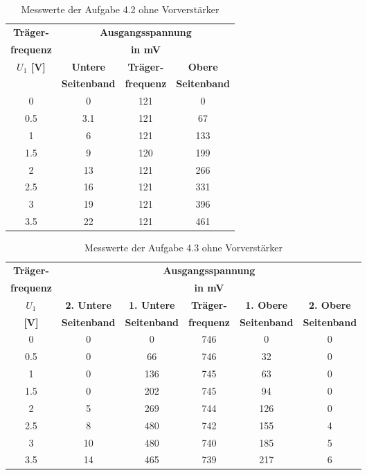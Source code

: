 \documentclass[12pt]{scrartcl}
\begin{document}
\begin{table}[h] 
    \centering
    \begin{tabular}{|c|c|c|c|} 
          \hline         \textbf{Träger-}& \multicolumn{3}{c|}{\textbf{Ausgangsspannung}}\\
          \textbf{frequenz}  & \multicolumn{3}{c|}{\textbf{in mV}}\\ \hline
          \textbf{ $U_1$ [V]}  & \textbf{Untere} & \textbf{Träger-} & \textbf{Obere}  \\
               & \textbf{Seitenband}& \textbf{frequenz}  & \textbf{Seitenband}     \\ \hline
            0    & 0    & 121 & 0   \\ \hline
            0.5  & 3.1  & 121 & 67  \\ \hline
            1    & 6    & 121 & 133 \\ \hline
            1.5  & 9    & 120 & 199 \\ \hline 
            2    & 13   & 121 & 266 \\ \hline
            2.5  & 16   & 121 & 331 \\ \hline
            3    & 19   & 121 & 396 \\ \hline
            3.5  & 22   & 121 & 461 \\ \hline
    \end{tabular}
    \caption{Messwerte der Aufgabe 4.2 ohne Vorverstärker} \label{tab:Aufgabe4.2}
\end{table}
\begin{table}[h] 
    \centering
    \begin{tabular}{|c|c|c|c|c|c|} 
          \hline         \textbf{Träger-}& \multicolumn{5}{c|}{\textbf{Ausgangsspannung}}\\
          \textbf{frequenz}  & \multicolumn{5}{c|}{\textbf{in mV}}\\ \hline
          \textbf{ $U_1$} & \textbf{2. Untere}  & \textbf{1. Untere} & \textbf{Träger-} & \textbf{1. Obere}  & \textbf{2. Obere}\\
            \textbf{[V]}  & \textbf{Seitenband}   & \textbf{Seitenband}& \textbf{frequenz}  & \textbf{Seitenband}  & \textbf{Seitenband}   \\ \hline
            0    & 0 & 0   & 746 & 0   & 0 \\ \hline
            0.5  & 0 & 66  & 746 & 32  & 0 \\ \hline
            1    & 0 & 136 & 745 & 63  & 0 \\ \hline
            1.5  & 0 & 202 & 745 & 94  & 0 \\ \hline
            2    & 5 & 269 & 744 & 126 & 0 \\ \hline
            2.5  & 8 & 480 & 742 & 155 & 4 \\ \hline
            3    & 10& 480 & 740 & 185 & 5 \\ \hline
            3.5  & 14& 465 & 739 & 217 & 6 \\ \hline
    \end{tabular}
    \caption{Messwerte der Aufgabe 4.3 ohne Vorverstärker} \label{tab:Aufgabe4.3}
\end{table}
\end{document}
